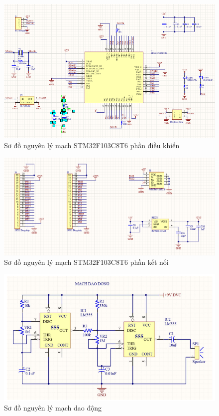             \begin{figure}[H]
                \centering
                \includegraphics[width=1\textwidth]{pictures/sch4a.png}
                \caption{Sơ đồ nguyên lý mạch STM32F103C8T6 phần điều khiển}
                \label{fig:sodonguyenly}
            \end{figure}
            \begin{figure}[H]
                \centering
                \includegraphics[width=1\textwidth]{pictures/4b.png}
                \caption{Sơ đồ nguyên lý mạch STM32F103C8T6 phần kết nối}
                \label{fig:sodonguyenly}
            \end{figure}
            \begin{figure}[H]
                \centering
                \includegraphics[width=1\textwidth]{pictures/sch5.png}
                \caption{Sơ đồ nguyên lý mạch dao động}
                \label{fig:sodonguyenly}
            \end{figure}
            \cleardoublepage

